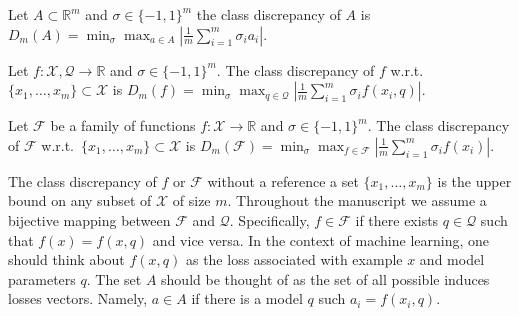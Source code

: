 \documentclass[anon,12pt]{colt2019} %
\newcommand{\todo}[1]{\textcolor{red}{TODO: #1}}
\newcommand{\R}{\mathbb{R}}
\newcommand{\F}{\mathcal{F}}
\newcommand{\X}{\mathcal{X}}
\newcommand{\Q}{\mathcal{Q}}
\begin{document}
\begin{definition} \label{cd1}
Let $A \subset \R^m$ and $\sigma \in \{-1,1\}^m$ the class discrepancy of $A$ is 
$
D_m(A)  = \min_\sigma \max_{a\in A} \left| \frac{1}{m} \sum_{i=1}^{m}  \sigma_i  a_i\right| 
$.
\end{definition}
%
\begin{definition}\label{cd2}
Let $f:\X,\Q\rightarrow\R$ and $\sigma \in \{-1,1\}^m$. 
The class discrepancy of $f$ w.r.t.\ $\{x_1,\ldots,x_m\} \subset \X$ is 
$
D_m(f) =  \min_{\sigma} \max_{q \in \Q}  \left|\frac{1}{m} \sum_{i=1}^{m}\sigma_i f(x_i,q)\right|
$.
\end{definition}
%
\begin{definition}\label{cd3}
Let $\F$ be a family of functions $f:\X\rightarrow\R$ and $\sigma \in \{-1,1\}^m$. 
The class discrepancy of $\F$ w.r.t.\ $\{x_1,\ldots,x_m\} \subset \X$ is 
$
D_m(\F) =  \min_{\sigma} \max_{f \in \F}  \left| \frac{1}{m} \sum_{i=1}^{m}\sigma_i f(x_i)\right|
$.
\end{definition}
The class discrepancy of $f$ or $\F$ without a reference a set $\{x_1,\ldots,x_m\}$ is the upper bound on any subset of $\X$ of size $m$.
Throughout the manuscript we assume a bijective mapping between $\F$ and $\Q$. 
Specifically, $f \in \F$ if there exists $q \in \Q$ such that $f(x) = f(x,q)$ and vice versa. 
In the context of machine learning, one should think about $f(x,q)$ as the loss associated with example $x$ and model parameters $q$.
The set $A$ should be thought of as the set of all possible induces losses vectors. 
Namely, $a\in A$ if there is a model $q$ such $a_i = f(x_i,q)$.


\end{document}
